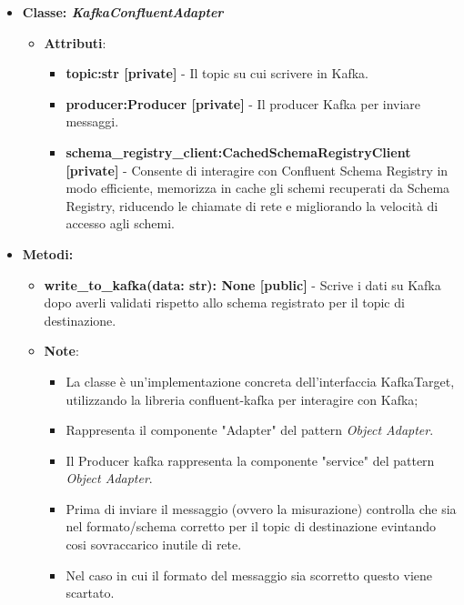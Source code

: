 \begin{itemize}
\begin{itemize}
    \end{itemize}
    \item{\textbf{Classe: \textit{KafkaConfluentAdapter}}}
    \begin{itemize}
        \item\textbf{Attributi}:
        \begin{itemize}
            \item \textbf{topic:str [private]} - Il topic su cui scrivere in Kafka.
            \item \textbf{producer:Producer [private]} - Il producer Kafka per inviare messaggi.
            \item \textbf{schema\_registry\_client:CachedSchemaRegistryClient [private]} - Consente di interagire con Confluent Schema Registry in modo efficiente, memorizza in cache gli schemi recuperati da Schema Registry, riducendo le chiamate di rete e migliorando la velocità di accesso agli schemi.
        \end{itemize}
    \end{itemize}
    \item \textbf{Metodi: }
    \begin{itemize}
        \item \textbf{write\_to\_kafka(data: str): None [public]} - Scrive i dati su Kafka dopo averli validati rispetto allo schema registrato per il topic di destinazione.
    \item\textbf{Note}:
        \begin{itemize}
            \item La classe è un'implementazione concreta dell'interfaccia KafkaTarget, utilizzando la libreria confluent-kafka per interagire con Kafka;
            \item Rappresenta il componente "Adapter" del pattern \textit{Object Adapter}.
            \item Il Producer kafka rappresenta la componente "service" del pattern \textit{Object Adapter}.
            \item Prima di inviare il messaggio  (ovvero la misurazione) controlla che sia nel formato/schema corretto per il topic di destinazione evintando cosi sovraccarico inutile di rete.
            \item Nel caso in cui il formato del messaggio sia scorretto questo viene scartato.
        \end{itemize}
    \end{itemize}
\end{itemize}


